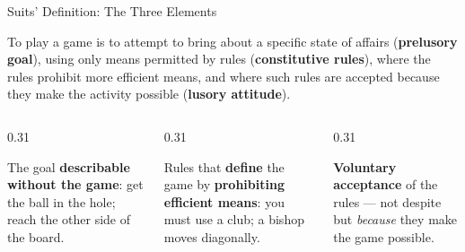 \documentclass[aspectratio=169,11pt]{beamer}
\begin{document}
\begin{frame}[t]{Suits' Definition: The Three Elements}
\vspace{-0.2cm}
\begin{conceptbox}
\footnotesize
To play a game is to attempt to bring about a specific state of affairs (\textbf{prelusory goal}), using only means permitted by rules (\textbf{constitutive rules}), where the rules prohibit more efficient means, and where such rules are accepted because they make the activity possible (\textbf{lusory attitude}).
\end{conceptbox}

\vspace{0.05cm}
\begin{columns}[T]
\begin{column}{0.31\textwidth}
\begin{conceptbox}
\scriptsize
The goal \textbf{describable without the game}: get the ball in the hole; reach the other side of the board.
\end{conceptbox}
\end{column}
\begin{column}{0.31\textwidth}
\begin{conceptbox}
\scriptsize
Rules that \textbf{define} the game by \textbf{prohibiting efficient means}: you must use a club; a bishop moves diagonally.
\end{conceptbox}
\end{column}
\begin{column}{0.31\textwidth}
\begin{conceptbox}
\scriptsize
\textbf{Voluntary acceptance} of the rules --- not despite but \emph{because} they make the game possible.
\end{conceptbox}
\end{column}
\end{columns}
\end{frame}
\end{document}
